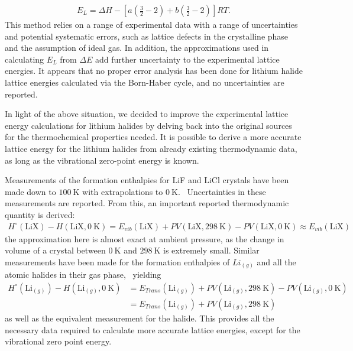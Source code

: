 \documentclass[preprint,aps,prb,floatfix]{revtex4-1}
\begin{document}
\begin{align}
E_{L} =\Delta H - \left[ a \left( \frac { 3 } { 2 } - 2 \right) + b \left( \frac { 3 } { 2 } - 2 \right) \right] R T.
\end{align}
This method relies on a range of experimental data with a range of uncertainties and potential systematic errors, such as lattice defects in the crystalline phase and the assumption of ideal gas. In addition, the approximations used in calculating $E_{L}$ from $\Delta E$ add further uncertainty to the experimental lattice energies. It appears that no proper error analysis has been done for lithium halide lattice energies calculated via the Born-Haber cycle, and no uncertainties are reported.~\cite{book:CRC}

In light of the above situation, we decided to improve the experimental lattice energy calculations for lithium halides by delving back into the original sources for the thermochemical properties needed. It is possible to derive a more accurate lattice energy for the lithium halides from already existing thermodynamic data, as long as the vibrational zero-point energy is known. 

Measurements of the formation enthalpies for LiF and LiCl crystals have been made down to $\SI{100}{\kelvin}$ with extrapolations to $\SI{0}{\kelvin}$.~\cite{chase1998nist} Uncertainties in these measurements are reported. From this, an important reported thermodynamic quantity is derived:
\begin{align}
H^{\circ} (\text{LiX}) - H (\text{LiX}, \SI{0}{\kelvin}) = E_{vib}(\text{LiX}) + PV (\text{LiX},\SI{298}{\kelvin}) - PV (\text{LiX},\SI{0}{\kelvin}) \approx E_{vib}(\text{LiX})
\end{align}
the approximation here is almost exact at ambient pressure, as the change in volume of a crystal between $\SI{0}{\kelvin}$ and $\SI{298}{\kelvin}$ is extremely small. Similar measurements have been made for the formation enthalpies of $Li_{(g)}$ and all the atomic halides in their gas phase,~\cite{chase1998nist,cox1984codata} yielding
\begin{align}
H^{\circ} (\text{Li}_{(g)}) - H (\text{Li}_{(g)}, \SI{0}{\kelvin}) &= E_{Trans}(\text{Li}_{(g)}) + PV (\text{Li}_{(g)},\SI{298}{\kelvin}) - PV (\text{Li}_{(g)},\SI{0}{\kelvin})\\ &= E_{Trans}(\text{Li}_{(g)}) + PV (\text{Li}_{(g)},\SI{298}{\kelvin})
\end{align}
as well as the equivalent measurement for the halide. This provides all the necessary data required to calculate more accurate lattice energies, except for the vibrational zero point energy.
\end{document}
